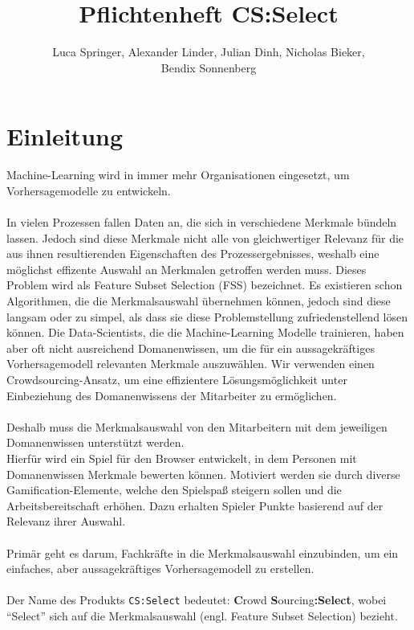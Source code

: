 \documentclass[a4paper]{scrreprt}
\begin{document}
    \title{Pflichtenheft CS:Select}
    \author{Luca Springer, Alexander Linder, Julian Dinh, Nicholas Bieker,\\ Bendix Sonnenberg}
    \maketitle

    \tableofcontents

    \chapter{Einleitung}
    Machine-Learning wird in immer mehr Organisationen eingesetzt, um Vorhersagemodelle zu entwickeln.\\\\
    In vielen Prozessen fallen Daten an, die sich in verschiedene Merkmale bündeln lassen.
    Jedoch sind diese Merkmale nicht alle von gleichwertiger Relevanz für die aus ihnen resultierenden Eigenschaften des Prozessergebnisses, weshalb eine möglichst effizente Auswahl an Merkmalen getroffen werden muss.
    Dieses Problem wird als Feature Subset Selection (FSS) bezeichnet.
    Es existieren schon Algorithmen, die die Merkmalsauswahl übernehmen können, jedoch sind diese langsam oder zu simpel, als dass sie diese Problemstellung zufriedenstellend lösen können.
    Die Data-Scientists, die die Machine-Learning Modelle trainieren, haben aber oft nicht ausreichend \Gls{Domanenwissen}, um die für ein aussagekräftiges Vorhersagemodell relevanten Merkmale auszuwählen.
    Wir verwenden einen Crowdsourcing-Ansatz, um eine effizientere Lösungsmöglichkeit unter Einbeziehung des \Gls{Domanenwissen}s der Mitarbeiter zu ermöglichen.\\\\
    Deshalb muss die Merkmalsauswahl von den Mitarbeitern mit dem jeweiligen \Gls{Domanenwissen} unterstützt werden.\\
    Hierfür wird ein \Gls{Spiel} für den Browser entwickelt, in dem Personen mit \Gls{Domanenwissen} Merkmale bewerten können.
    Motiviert werden sie durch diverse Gamification-Elemente, welche den Spielspaß steigern sollen und die Arbeitsbereitschaft erhöhen.
    Dazu erhalten Spieler Punkte basierend auf der Relevanz ihrer Auswahl.\\\\
    Primär geht es darum, Fachkräfte in die Merkmalsauswahl einzubinden, um ein einfaches, aber aussagekräftiges Vorhersagemodell zu erstellen.\\\\
    Der Name des Produkts \texttt{CS:Select} bedeutet: \textbf{C}rowd \textbf{S}ourcing\textbf{:Select}, wobei \enquote{Select} sich auf die Merkmalsauswahl (engl. Feature Subset Selection) bezieht.
\end{document}
